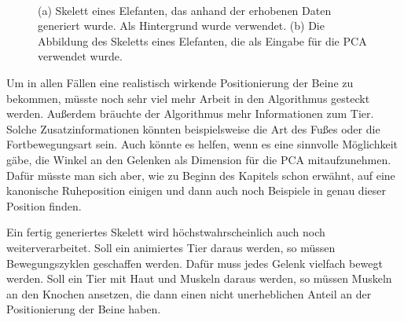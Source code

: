 \begin{figure}
 ~
 
 \caption{(a) Skelett eines Elefanten, das anhand der erhobenen Daten generiert wurde. Als Hintergrund wurde \cite{background} verwendet. (b) Die Abbildung des Skeletts eines Elefanten, die als Eingabe für die PCA verwendet wurde.}
 \label{elefant}
\end{figure}


Um in allen Fällen eine realistisch wirkende Positionierung der Beine zu bekommen, müsste noch sehr viel mehr Arbeit in den Algorithmus gesteckt werden. Außerdem bräuchte der Algorithmus mehr Informationen zum Tier. Solche Zusatzinformationen könnten beispielsweise die Art des Fußes oder die Fortbewegungsart sein. Auch könnte es helfen, wenn es eine sinnvolle Möglichkeit gäbe, die Winkel an den Gelenken als Dimension für die PCA mitaufzunehmen. Dafür müsste man sich aber, wie zu Beginn des Kapitels schon erwähnt, auf eine kanonische Ruheposition einigen und dann auch noch Beispiele in genau dieser Position finden.

Ein fertig generiertes Skelett wird höchstwahrscheinlich auch noch weiterverarbeitet. Soll \zb ein animiertes Tier daraus werden, so müssen Bewegungszyklen geschaffen werden. Dafür muss jedes Gelenk vielfach bewegt werden. Soll ein Tier mit Haut und Muskeln daraus werden, so müssen Muskeln an den Knochen ansetzen, die dann einen nicht unerheblichen Anteil an der Positionierung der Beine haben.

